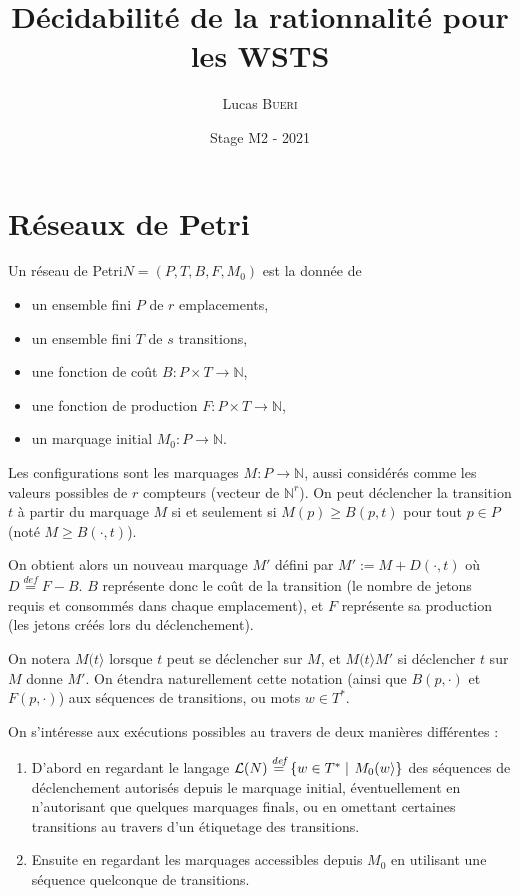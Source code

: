\documentclass[a4paper,final]{article}
\title{Décidabilité de la rationnalité pour les WSTS}
\author{Lucas \textsc{Bueri}}
\date{Stage M2 - 2021}
\let\geq\geqslant
\newcommand{\set}[2]{\left\{#1\mathrel{\left|\vphantom{#1}\vphantom{#2}\right.}#2\right\}}
\newcommand{\defeq}{\ensuremath{\stackrel{\textit{def}}{=}}}
\newcommand{\N}{\ensuremath{\mathbb{N}}}
\newcommand{\petri}{réseau de Petri\xspace}
\newcommand{\fire}[2]{\ensuremath{#1 (#2\rangle}}
\newcommand{\lang}{\ensuremath{\mathcal{L}}}
\begin{document}
\maketitle


\section{Réseaux de Petri}

Un \petri $N = (P,T,B,F,M_0)$ est la donnée de
\begin{itemize}
    \item un ensemble fini $P$ de $r$ emplacements,
    \item un ensemble fini $T$ de $s$ transitions,
    \item une fonction de coût $B: P\times T\to\N$,
    \item une fonction de production $F: P\times T\to\N$,
    \item un marquage initial $M_0: P\to\N$.
\end{itemize}

Les configurations sont les marquages $M: P\to\N$, aussi considérés comme les valeurs possibles de $r$ compteurs (vecteur de $\N^r$).
On peut déclencher la transition $t$ à partir du marquage $M$ si et seulement si $M(p)\geq B(p,t)$ pour tout $p\in P$ (noté $M\geq B(\cdot,t)$).

On obtient alors un nouveau marquage $M'$ défini par $M':=M+D(\cdot,t)$ où $D\defeq F-B$. 
$B$ représente donc le coût de la transition (le nombre de jetons requis et consommés dans chaque emplacement), et $F$ représente sa production (les jetons créés lors du déclenchement).

On notera $\fire{M}{t}$ lorsque $t$ peut se déclencher sur $M$, et $\fire{M}{t}M'$ si déclencher $t$ sur $M$ donne $M'$.
On étendra naturellement cette notation (ainsi que $B(p,\cdot)$ et $F(p,\cdot)$) aux séquences de transitions, ou mots $w\in T^\ast$.

On s'intéresse aux exécutions possibles au travers de deux manières différentes :
\begin{enumerate}
    \item D'abord en regardant le langage $\lang(N)\defeq \set{w\in T^\ast} {\fire{M_0}{w}}$ des séquences de déclenchement autorisés depuis le marquage initial, éventuellement en n'autorisant que quelques marquages finals, ou en omettant certaines transitions au travers d'un étiquetage des transitions.
    \item Ensuite en regardant les marquages accessibles depuis $M_0$ en utilisant une séquence quelconque de transitions.
\end{enumerate}
\end{document}
